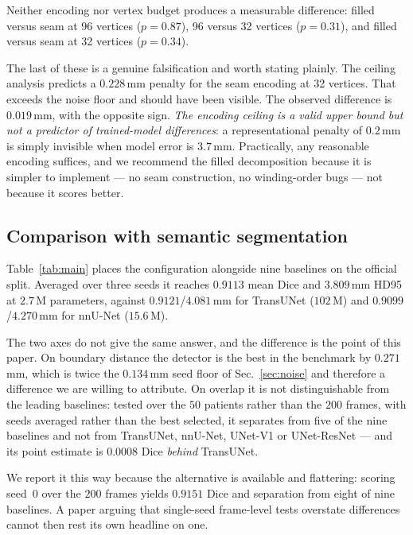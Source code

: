 Neither encoding nor vertex budget produces a measurable difference: filled
versus seam at 96 vertices ($p{=}0.87$), 96 versus 32 vertices ($p{=}0.31$), and
filled versus seam at 32 vertices ($p{=}0.34$).

The last of these is a genuine falsification and worth stating plainly. The
ceiling analysis predicts a $0.228$\,mm penalty for the seam encoding at 32
vertices. That exceeds the noise floor and should have been visible. The
observed difference is $0.019$\,mm, with the opposite sign. \emph{The encoding
ceiling is a valid upper bound but not a predictor of trained-model
differences}: a representational penalty of $0.2$\,mm is simply invisible when
model error is $3.7$\,mm. Practically, any reasonable encoding suffices, and we
recommend the filled decomposition because it is simpler to implement --- no
seam construction, no winding-order bugs --- not because it scores better.

\subsection{Comparison with semantic segmentation}



Table~\ref{tab:main} places the configuration alongside nine baselines on the
official split. Averaged over three seeds it reaches $0.9113$ mean Dice and
$3.809$\,mm HD95 at $2.7$\,M parameters, against $0.9121$/$4.081$\,mm for
TransUNet ($102$\,M) and $0.9099$/$4.270$\,mm for nnU-Net ($15.6$\,M).

The two axes do not give the same answer, and the difference is the point of
this paper. On boundary distance the detector is the best in the benchmark by
$0.271$\,mm, which is twice the $0.134$\,mm seed floor of
Sec.~\ref{sec:noise} and therefore a difference we are willing to attribute. On
overlap it is not distinguishable from the leading baselines: tested over the
$50$ patients rather than the $200$ frames, with seeds averaged rather than the
best selected, it separates from five of the nine baselines and not from
TransUNet, nnU-Net, UNet-V1 or UNet-ResNet --- and its point estimate is
$0.0008$ Dice \emph{behind} TransUNet.

We report it this way because the alternative is available and flattering:
scoring seed~0 over the $200$ frames yields $0.9151$ Dice and separation from
eight of nine baselines. A paper arguing that single-seed frame-level tests
overstate differences cannot then rest its own headline on one.

